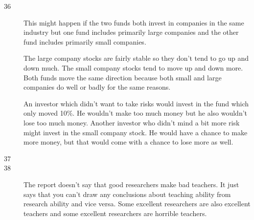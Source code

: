 \documentclass{exam}
\begin{document}
\begin{description}

      \item[36] This might happen if the two funds both invest in companies in the same
        industry but one fund includes primarily large companies and the other fund
        includes primarily small companies.  
        
        The large company stocks are fairly stable so they don't tend to go up and down
        much.  The small company stocks tend to move up and down more.  Both funds move
        the same direction because both small and large companies do well or badly for the
        same reasons.

        An investor which didn't want to take risks would invest in the fund which only
        moved 10\%.  He wouldn't make too much money but he also wouldn't lose too much
        money.  Another investor who didn't mind a bit more risk might invest in the small
        company stock.  He would have a chance to make more money, but that would come
        with a chance to lose more as well.

      \item[37]

      \item[38]
        The report doesn't say that good researchers make bad teachers.  It just says that
        you can't draw any conclusions about teaching ability from research ability and
        vice versa.  Some excellent researchers are also excellent teachers and some
        excellent researchers are horrible teachers.


\end{description}
\end{document}

